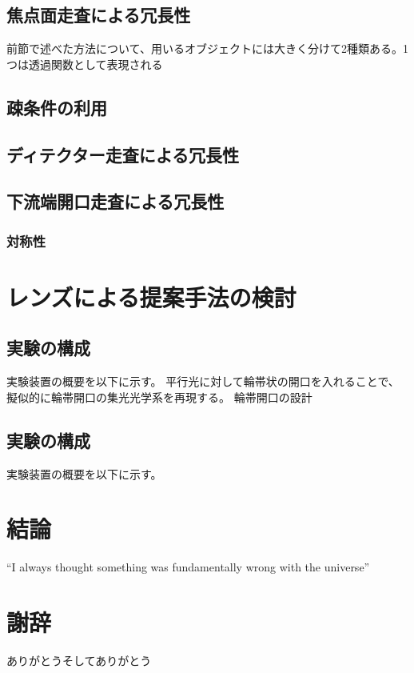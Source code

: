 \documentclass[dvipdfmx,autodetect-engine]{jreport}
\begin{document}
\section{焦点面走査による冗長性}
前節で述べた方法について、用いるオブジェクトには大きく分けて2種類ある。1つは透過関数として表現される

\section{疎条件の利用}

\section{ディテクター走査による冗長性}

\section{下流端開口走査による冗長性}

\subsection{対称性}

\newpage
\chapter{レンズによる提案手法の検討}

\newpage

\section{実験の構成}
実験装置の概要を以下に示す。
平行光に対して輪帯状の開口を入れることで、擬似的に輪帯開口の集光光学系を再現する。
輪帯開口の設計

\section{実験の構成}
実験装置の概要を以下に示す。


\newpage
\chapter{結論}
``I always thought something was fundamentally wrong with the universe'' \citep{adams1995hitchhiker}

\newpage
\chapter{謝辞}
ありがとうそしてありがとう



\end{document}
